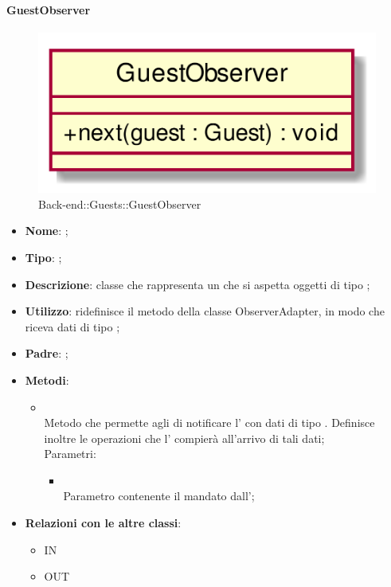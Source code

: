 \hypertarget{GuestObserver_label}{\paragraph{GuestObserver}}
\begin{figure}[h]
	\centering
	\includegraphics[width=\textwidth,height=\textheight,keepaspectratio]{images/ClassGuestObserver.png}
	\caption{Back-end::Guests::GuestObserver}
\end{figure}
\begin{itemize}
	\item \textbf{Nome}: ;
	\item \textbf{Tipo}: ;
	\item \textbf{Descrizione}: classe che rappresenta un  che si aspetta oggetti di tipo ;
	\item \textbf{Utilizzo}: ridefinisce il metodo  della classe ObserverAdapter, in modo che riceva dati di tipo ;
	\item \textbf{Padre}: ;
	\item \textbf{Metodi}:
	\begin{itemize}
		\item[]  \\
		Metodo che permette agli  di notificare l' con dati di tipo . Definisce inoltre le operazioni che l' compierà all'arrivo di tali dati;\\
		Parametri:
		\begin{itemize}
			\item {} \\
			Parametro contenente il  mandato dall';
		\end{itemize}
	\end{itemize}
	\item \textbf{Relazioni con le altre classi}:
	\begin{itemize}
		\item IN \hyperlink{GuestObservable_label}{}
		\item OUT \hyperlink{Guest_label}{}
	\end{itemize}
\end{itemize}
\FloatBarrier

